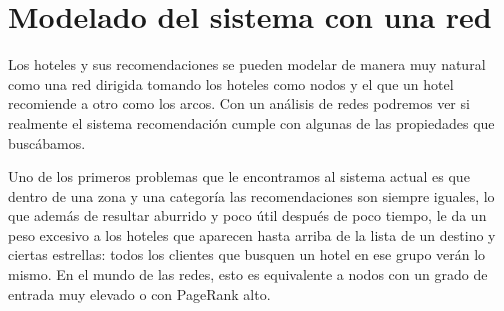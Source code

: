 \documentclass[12pt]{report}
\begin{document}
\section{Modelado del sistema con una red}

Los hoteles y sus recomendaciones se pueden modelar de manera muy natural como una red dirigida tomando los hoteles como nodos y el que un hotel recomiende a otro como los arcos. Con un análisis de redes podremos ver si realmente el sistema recomendación cumple con algunas de las propiedades que buscábamos.

Uno de los primeros problemas que le encontramos al sistema actual es que dentro de una zona y una categoría las recomendaciones son siempre iguales, lo que además de resultar aburrido y poco útil después de poco tiempo, le da un peso excesivo a los hoteles que aparecen hasta arriba de la lista de un destino y ciertas estrellas: todos los clientes que busquen un hotel en ese grupo verán lo mismo. En el mundo de las redes, esto es equivalente a nodos con un grado de entrada muy elevado o con PageRank alto.
\end{document}
